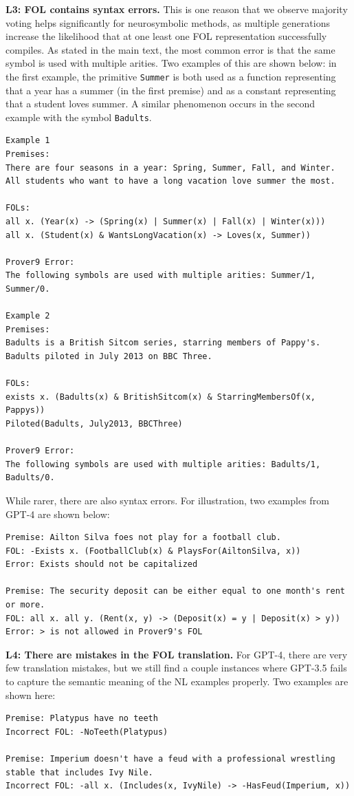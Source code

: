 \textbf{L3: FOL contains syntax errors.} This is one reason that we observe majority voting helps significantly for neurosymbolic methods, as multiple generations increase the likelihood that at one least one FOL representation successfully compiles. As stated in the main text, the most common error is that the same symbol is used with multiple arities. Two examples of this are shown below: in the first example, the primitive \texttt{Summer} is both used as a function representing that a year has a summer (in the first premise) and as a constant representing that a student loves summer. A similar phenomenon occurs in the second example with the symbol \texttt{Badults}.

\begin{lstlisting}[breaklines=true]
Example 1
Premises:
There are four seasons in a year: Spring, Summer, Fall, and Winter.
All students who want to have a long vacation love summer the most.

FOLs:
all x. (Year(x) -> (Spring(x) | Summer(x) | Fall(x) | Winter(x)))
all x. (Student(x) & WantsLongVacation(x) -> Loves(x, Summer))

Prover9 Error:
The following symbols are used with multiple arities: Summer/1, Summer/0.

Example 2
Premises:
Badults is a British Sitcom series, starring members of Pappy's.
Badults piloted in July 2013 on BBC Three.

FOLs:
exists x. (Badults(x) & BritishSitcom(x) & StarringMembersOf(x, Pappys))
Piloted(Badults, July2013, BBCThree)

Prover9 Error:
The following symbols are used with multiple arities: Badults/1, Badults/0.
\end{lstlisting}

While rarer, there are also syntax errors. For illustration, two examples from GPT-4 are shown below:
\begin{lstlisting}[breaklines=true]
Premise: Ailton Silva foes not play for a football club.
FOL: -Exists x. (FootballClub(x) & PlaysFor(AiltonSilva, x))
Error: Exists should not be capitalized

Premise: The security deposit can be either equal to one month's rent or more.
FOL: all x. all y. (Rent(x, y) -> (Deposit(x) = y | Deposit(x) > y))
Error: > is not allowed in Prover9's FOL
\end{lstlisting}

\textbf{L4: There are mistakes in the FOL translation.} For GPT-4, there are very few translation mistakes, but we still find a couple instances where GPT-3.5 fails to capture the semantic meaning of the NL examples properly. Two examples are shown here:
\begin{lstlisting}[breaklines=true]
Premise: Platypus have no teeth
Incorrect FOL: -NoTeeth(Platypus)

Premise: Imperium doesn't have a feud with a professional wrestling stable that includes Ivy Nile.
Incorrect FOL: -all x. (Includes(x, IvyNile) -> -HasFeud(Imperium, x))
\end{lstlisting}

